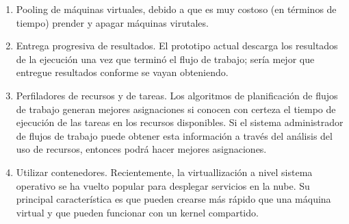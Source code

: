 \begin{enumerate}
\item{Pooling de m\'aquinas virtuales, debido a que es muy costoso (en t\'erminos de tiempo) prender y apagar m\'aquinas virutales.}
\item{Entrega progresiva de resultados. El prototipo actual descarga los resultados de la ejecuci\'on una vez que termin\'o el flujo de trabajo; ser\'ia mejor que entregue resultados conforme se vayan obteniendo.}
\item{Perfiladores de recursos y de tareas. Los algoritmos de planificación de flujos de trabajo generan mejores asignaciones si conocen con certeza el tiempo de ejecución de las tareas en los recursos disponibles. Si el sistema administrador de flujos de trabajo puede obtener esta información a través del análisis del uso de recursos, entonces podrá hacer mejores asignaciones.}
\item{Utilizar contenedores. Recientemente, la virtuallizaci\'on a nivel sistema operativo se ha vuelto popular para desplegar servicios en la nube. Su principal caracter\'istica es que pueden crearse m\'as r\'apido que una m\'aquina virtual y que pueden funcionar con un kernel compartido.}
\end{enumerate}

